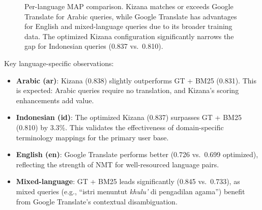 \documentclass[preprint,12pt,authoryear]{elsarticle}
\begin{document}
\begin{figure}[t]
\centering
{}
\caption{Per-language MAP comparison. Kizana matches or exceeds Google Translate for Arabic queries, while Google Translate has advantages for English and mixed-language queries due to its broader training data. The optimized Kizana configuration significantly narrows the gap for Indonesian queries (0.837 vs.\ 0.810).}
\label{fig:per-lang-comparison}
\end{figure}

Key language-specific observations:

\begin{itemize}
    \item \textbf{Arabic (ar)}: Kizana (0.838) slightly outperforms GT + BM25 (0.831). This is expected: Arabic queries require no translation, and Kizana's scoring enhancements add value.

    \item \textbf{Indonesian (id)}: The optimized Kizana (0.837) surpasses GT + BM25 (0.810) by 3.3\%. This validates the effectiveness of domain-specific terminology mappings for the primary user base.

    \item \textbf{English (en)}: Google Translate performs better (0.726 vs.\ 0.699 optimized), reflecting the strength of NMT for well-resourced language pairs.

    \item \textbf{Mixed-language}: GT + BM25 leads significantly (0.845 vs.\ 0.733), as mixed queries (e.g., ``istri menuntut \textit{khulu'} di pengadilan agama'') benefit from Google Translate's contextual disambiguation.
\end{itemize}
\end{document}
